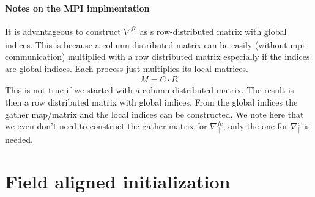 \paragraph{Notes on the MPI implmentation}
It is advantageous to construct $\nabla_\parallel^{fc}$
as s row-distributed matrix with global indices.
This is because a column distributed matrix can be easily (without mpi-communication) multiplied
with a row distributed matrix especially if the indices are global indices.
Each process just multiplies its local matrices.
\begin{align}
M = C\cdot R
\end{align}
This is not true if we started with a column distributed matrix.
The result is then a row distributed matrix with global indices.
From the global indices the gather map/matrix and the local
indices can be constructed.
We note here that we even don't need to construct the gather matrix
for $\nabla_\parallel^{fc}$, only the one for $\nabla_\parallel^c$ is
needed.
\section{Field aligned initialization} \label{sec:parallelc}

